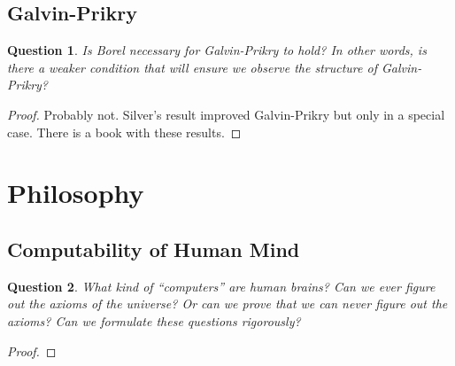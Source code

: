 \documentclass{article}
\newtheorem{question}{Question}[subsection]
\begin{document}
  \subsection{Galvin-Prikry}
    \begin{question}
      Is Borel necessary for Galvin-Prikry to hold? In other words, is
      there a weaker condition that will ensure we observe the structure of
      Galvin-Prikry?
    \end{question}
    \begin{proof}
      Probably not. Silver's result improved Galvin-Prikry but only in a
      special case. There is a book with these results.
    \end{proof}

\section{Philosophy}
  \subsection{Computability of Human Mind}
    \begin{question}
      What kind of ``computers'' are human brains? Can we ever figure out
      the axioms of the universe? Or can we prove that we can never figure
      out the axioms? Can we formulate these questions rigorously?
    \end{question}
    \begin{proof}
    \end{proof}
\end{document}
